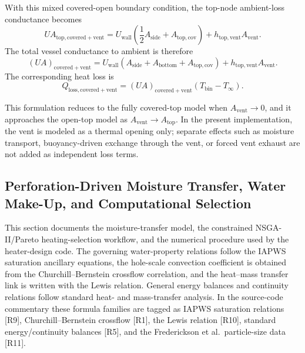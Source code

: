 \documentclass{article}
\begin{document}
With this mixed covered-open boundary condition, the top-node ambient-loss
conductance becomes
\begin{equation}
    UA_{\mathrm{top,covered+vent}} =
    U_{\mathrm{wall}}\left(\frac{1}{2}A_{\mathrm{side}} + A_{\mathrm{top,cov}}\right)
    + h_{\mathrm{top,vent}} A_{\mathrm{vent}}.
\end{equation}
The total vessel conductance to ambient is therefore
\begin{equation}
    (UA)_{\mathrm{covered+vent}} =
    U_{\mathrm{wall}}\left(A_{\mathrm{side}} + A_{\mathrm{bottom}} + A_{\mathrm{top,cov}}\right)
    + h_{\mathrm{top,vent}} A_{\mathrm{vent}}.
\end{equation}
The corresponding heat loss is
\begin{equation}
    Q_{\mathrm{loss,covered+vent}} =
    (UA)_{\mathrm{covered+vent}} \left(T_{\mathrm{bin}} - T_{\infty}\right).
\end{equation}

This formulation reduces to the fully covered-top model when
$A_{\mathrm{vent}} \rightarrow 0$, and it approaches the open-top model as
$A_{\mathrm{vent}} \rightarrow A_{\mathrm{top}}$. In the present
implementation, the vent is modeled as a thermal opening only; separate
effects such as moisture transport, buoyancy-driven exchange through the
vent, or forced vent exhaust are not added as independent loss terms.

\subsection{Perforation-Driven Moisture Transfer, Water Make-Up, and Computational Selection}

This section documents the moisture-transfer model, the constrained
NSGA-II/Pareto heating-selection workflow, and the numerical procedure used by the heater-design
code. The governing water-property relations follow the IAPWS saturation
ancillary equations, the hole-scale convection coefficient is obtained from
the Churchill--Bernstein crossflow correlation, and the heat--mass transfer
link is written with the Lewis relation. General energy balances and
continuity relations follow standard heat- and mass-transfer analysis.
In the source-code commentary these formula families are tagged as
IAPWS saturation relations [R9], Churchill--Bernstein crossflow [R1], the
Lewis relation [R10], standard energy/continuity balances [R5], and the
Frederickson et al.\ particle-size data [R11].
\end{document}
